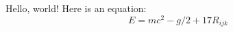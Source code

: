 \documentclass{article}
\begin{document}
Hello, world! Here is an equation:
\[
E = mc^2 - g/2 + 17R_{ijk}
\]
\end{document}
